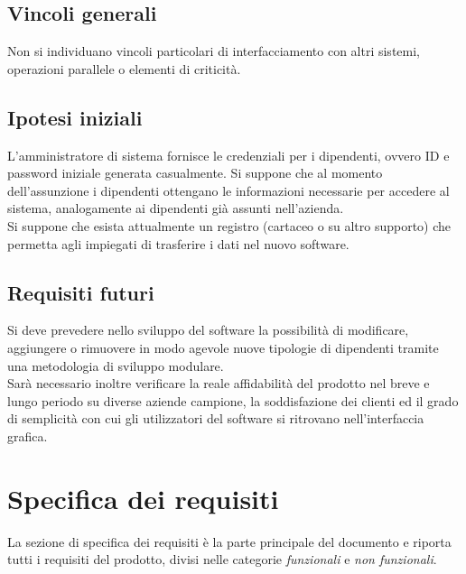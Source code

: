 \documentclass{scrreprt}
\begin{document}

\section{Vincoli generali}
Non si individuano vincoli particolari di interfacciamento con altri sistemi, operazioni parallele o elementi di criticità.


\section{Ipotesi iniziali}
L'amministratore di sistema fornisce le credenziali per i dipendenti, ovvero ID e password iniziale generata casualmente. Si suppone che al momento dell'assunzione i dipendenti ottengano le informazioni necessarie per accedere al sistema, analogamente ai dipendenti già assunti nell'azienda.\\
Si suppone che esista attualmente un registro (cartaceo o su altro supporto) che permetta agli impiegati di trasferire i dati nel nuovo software.


\section{Requisiti futuri}
Si deve prevedere nello sviluppo del software la possibilità di modificare, aggiungere o rimuovere in modo agevole nuove tipologie di dipendenti tramite una metodologia di sviluppo modulare.\\
Sarà necessario inoltre verificare la reale affidabilità del prodotto nel breve e lungo periodo su diverse aziende campione, la soddisfazione dei clienti ed il grado di semplicità con cui gli utilizzatori del software si ritrovano nell'interfaccia grafica.


\chapter{Specifica dei requisiti}
La sezione di specifica dei requisiti è la parte principale del documento e riporta tutti i requisiti del prodotto, divisi nelle categorie \textit{funzionali} e \textit{non funzionali}.
\end{document}
